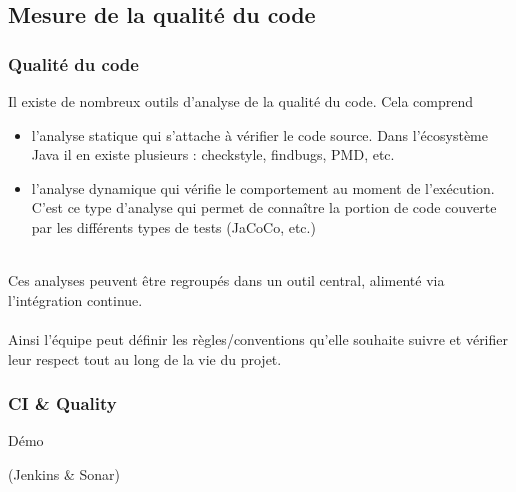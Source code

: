 \subsection{Mesure de la qualit\'{e} du code}
\begin{frame}
	\frametitle{Qualit\'{e} du code}
    Il existe de nombreux outils d'analyse de la qualit\'{e} du code.
    Cela comprend
    \begin{itemize}
        \item l'analyse statique qui s'attache \`{a} v\'{e}rifier le code source. Dans l'\'{e}cosyst\`{e}me Java il en existe plusieurs : checkstyle, findbugs, PMD, etc.
        \item l'analyse dynamique qui v\'{e}rifie le comportement au moment de l'ex\'{e}cution. C'est ce type d'analyse qui permet de conna\^{i}tre la portion de code couverte par les diff\'{e}rents types de tests (JaCoCo, etc.)
    \end{itemize}
    ~\\
    Ces analyses peuvent \^{e}tre regroup\'{e}s dans un outil central, aliment\'{e} via l'int\'{e}gration continue.
    \\~\\
    Ainsi l'\'{e}quipe peut d\'{e}finir les r\`{e}gles/conventions qu'elle souhaite suivre et v\'{e}rifier leur respect tout au long de la vie du projet.
\end{frame}

\begin{frame}
	\frametitle{CI \& Quality}
    \begin{center}
    \fontsize{48pt}{7.2}\selectfont
    D\'{e}mo
    \end{center}
    \begin{center}
    (Jenkins \& Sonar)
    \end{center}
\end{frame}

